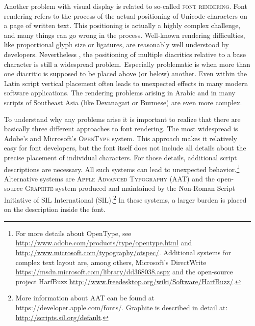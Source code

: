 
Another problem with visual display is related to so-called \textsc{font
rendering}. Font rendering refers to the process of the actual positioning of
Unicode characters on a page of written text. This positioning is actually a
highly complex challenge, and many things can go wrong in the process. Well-known
rendering difficulties, like proportional glyph size or ligatures, are reasonably
well understood by developers. Nevertheless	, the positioning of multiple diacritics relative to
a base character is still a widespread problem. Especially problematic is when 
more than one diacritic is supposed to be placed above (or
below) another. Even within the Latin script vertical placement 
often leads to unexpected effects in many modern software applications. 
The rendering problems arising in Arabic and in many scripts of Southeast
Asia (like Devanagari or Burmese) are even more complex. 

To understand why any problems arise it is important to realize that there are
basically three different approaches to font rendering. The most widespread is
Adobe's and Microsoft's \textsc{OpenType} system. This approach makes it
relatively easy for font developers, but the font itself does not include all
details about the precise placement of individual characters. For those details,
additional script descriptions are necessary. All such systems can lead to
unexpected behavior.\footnote{For more details about OpenType, see
\url{http://www.adobe.com/products/type/opentype.html} and
\url{http://www.microsoft.com/typography/otspec/}. Additional systems for
complex text layout are, among others, Microsoft's DirectWrite
\url{https://msdn.microsoft.com/library/dd368038.aspx} and the open-source
project HarfBuzz \url{http://www.freedesktop.org/wiki/Software/HarfBuzz/}.}
Alternative systems are \textsc{Apple Advanced Typography} (AAT) and the
open-source \textsc{Graphite} system produced and maintained by the Non-Roman Script Initiative of SIL International 
(SIL).\footnote{More information about AAT can be found at
\url{https://developer.apple.com/fonts/}. \newline Graphite is described
in detail at:
\url{http://scripts.sil.org/default}.}
In these systems, a larger burden is placed on the description inside
the font.

